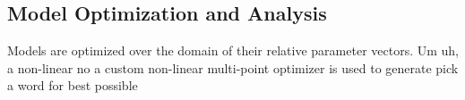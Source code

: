 \subsection{Model Optimization and Analysis}

Models are optimized over the domain of their relative parameter vectors. Um uh, a non-linear no a custom non-linear multi-point optimizer is used to generate pick a word for best possible 

\subsubsection{}
